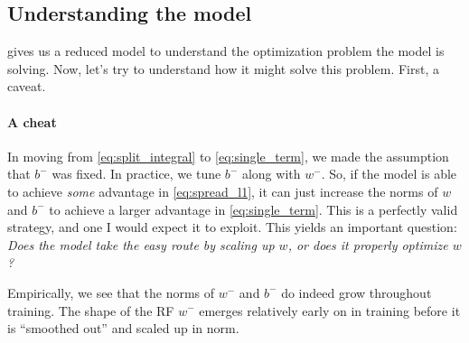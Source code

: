 \documentclass{article}
\begin{document}
\subsection*{Understanding the model}
 gives us a reduced model to understand the optimization problem the model is solving.
Now, let's try to understand how it might solve this problem.
First, a caveat.

\paragraph*{A cheat}
In moving from \cref{eq:split_integral} to \cref{eq:single_term}, we made the assumption that $b^-$ was fixed.
In practice, we tune $b^-$ along with $w^-$.
So, if the model is able to achieve \emph{some} advantage in \cref{eq:spread_l1}, it can just increase the norms of $w$ and $b^-$ to achieve a larger advantage in \cref{eq:single_term}.
This is a perfectly valid strategy, and one I would expect it to exploit.
This yields an important question: \emph{Does the model take the easy route by scaling up $w$, or does it properly optimize $w$?}

Empirically, we see that the norms of $w^-$ and $b^-$ do indeed grow throughout training.
The shape of the RF $w^-$ emerges relatively early on in training before it is ``smoothed out'' and scaled up in norm.

\end{document}
